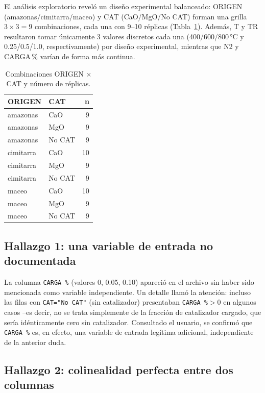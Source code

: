 \documentclass[11pt,a4paper]{article}
\begin{document}
El an\'alisis exploratorio revel\'o un dise\~no experimental balanceado:
ORIGEN (amazonas/cimitarra/maceo) y CAT (CaO/MgO/No CAT) forman una grilla
$3\times3=9$ combinaciones, cada una con 9--10 r\'eplicas (Tabla~\ref{tab:diseno}).
Adem\'as, T y TR resultaron tomar \'unicamente 3 valores discretos cada una
(400/600/800\,°C y 0.25/0.5/1.0, respectivamente) por dise\~no experimental,
mientras que N2 y CARGA\,\% var\'ian de forma m\'as continua.

\begin{table}[htbp]
\centering
\caption{Combinaciones ORIGEN $\times$ CAT y n\'umero de r\'eplicas.}
\label{tab:diseno}
\begin{tabular}{@{}llr@{}}
\toprule
ORIGEN & CAT & n \\
\midrule
amazonas & CaO & 9 \\
amazonas & MgO & 9 \\
amazonas & No CAT & 9 \\
cimitarra & CaO & 10 \\
cimitarra & MgO & 9 \\
cimitarra & No CAT & 9 \\
maceo & CaO & 10 \\
maceo & MgO & 9 \\
maceo & No CAT & 9 \\
\bottomrule
\end{tabular}
\end{table}

\subsection{Hallazgo 1: una variable de entrada no documentada}

La columna \texttt{CARGA\,\%} (valores 0, 0.05, 0.10) apareci\'o en el
archivo sin haber sido mencionada como variable independiente. Un detalle
llam\'o la atenci\'on: incluso las filas con \texttt{CAT="No CAT"} (sin
catalizador) presentaban \texttt{CARGA\,\%}$>0$ en algunos casos --es decir,
no se trata simplemente de la fracci\'on de catalizador cargado, que ser\'ia
id\'enticamente cero sin catalizador. Consultado el usuario, se confirm\'o
que \texttt{CARGA\,\%} es, en efecto, una variable de entrada leg\'itima
adicional, independiente de la anterior duda.

\subsection{Hallazgo 2: colinealidad perfecta entre dos columnas}
\end{document}
